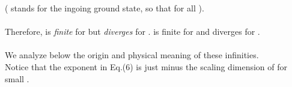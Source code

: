 \documentclass[12pt,a4paper]{article}
\begin{document}
(\coordHE{} stands for the ingoing ground state, so that 
\coordHE{} for all \coordHE{}). \\ \\
Therefore, \coordHE{} is {\it finite} for \coordHE{} but 
{\it diverges} for \coordHE{}. \coordHE{} is finite 
for \coordHE{} and diverges for \coordHE{}. \\ \\
We analyze below the origin and physical meaning of these infinities. \\
Notice that the exponent \myHighlight{$\beta $}\coordHE{} in Eq.(6) is just minus the 
scaling dimension of \coordHE{} for small \coordHE{}. 
\end{document}
